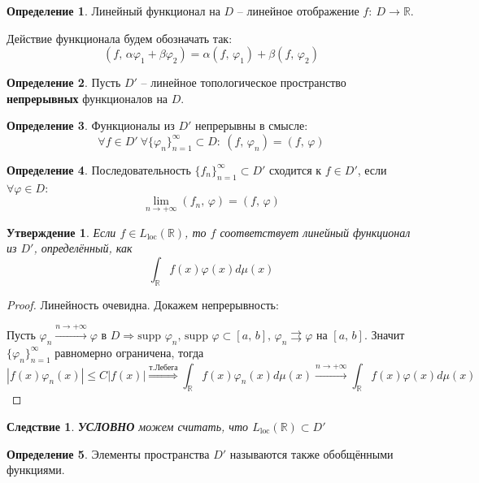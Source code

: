 \documentclass[a4paper,12pt]{article}
\renewcommand{\phi}{\ensuremath{\varphi}}
\renewcommand{\leq}{\ensuremath{\leqslant}}
\theoremstyle{plain}
\newtheorem{proposition}{Утверждение}[section]
\newtheorem*{corollary}{Следствие}
\theoremstyle{definition}
\newtheorem{definition}{Определение}[section]
\theoremstyle{remark}
\begin{document}
\begin{definition}
	Линейный функционал на $D$ -- линейное отображение $f:\: D \to \mathbb{R}$.

	Действие функционала будем обозначать так:
	\[(f,\, \alpha\phi_1 + \beta\phi_2) = \alpha(f,\,\phi_1) + \beta(f,\,\phi_2)\]
\end{definition}

\begin{definition}
	Пусть $D'$ -- линейное топологическое пространство \textbf{непрерывных} функционалов на $D$.
\end{definition}

\begin{definition}
	Функционалы из $D'$ непрерывны в смысле:
	\[\forall f \in D' \: \forall \{\phi_n\}_{n = 1}^\infty \subset D:\: (f,\,\phi_n) = (f,\,\phi)\]
\end{definition}

\begin{definition}
	Последовательность $\{f_n\}_{n = 1}^\infty \subset D'$ сходится к $f \in D'$, если $\forall \phi \in D$:
	\[\lim_{n \to +\infty}(f_n,\,\phi) = (f,\,\phi)\]
\end{definition}

\begin{proposition}
	Если $f \in L_{\text{loc}}(\mathbb{R})$, то $f$ соответствует линейный функционал из $D'$, определённый, как
	\[\int_\mathbb{R}f(x)\phi(x)d\mu(x)\] 
\end{proposition}

\begin{proof}
	Линейность очевидна. Докажем непрерывность:

	Пусть $\phi_n \stackrel{n \to +\infty}{\to} \phi$ в $D \Rightarrow \text{supp }\phi_n,\,\text{supp }\phi \subset [a,\,b],\, \phi_n \rightrightarrows \phi$ на $[a,\,b]$. Значит $\{\phi_n\}_{n = 1}^\infty$ равномерно ограничена, тогда 
	\[|f(x)\phi_n(x)| \leq C|f(x)| \stackrel{\text{т.Лебега}}{\Rightarrow} \int_\mathbb{R}f(x)\phi_n(x)d\mu(x) \stackrel{n \to +\infty}{\to} \int_\mathbb{R}f(x)\phi(x)d\mu(x)\]
\end{proof}

\begin{corollary}
	\textbf{УСЛОВНО} можем считать, что $L_{\text{loc}}(\mathbb{R}) \subset D'$
\end{corollary}

\begin{definition}
	Элементы пространства $D'$ называются также обобщёнными функциями.
\end{definition}
\end{document}
